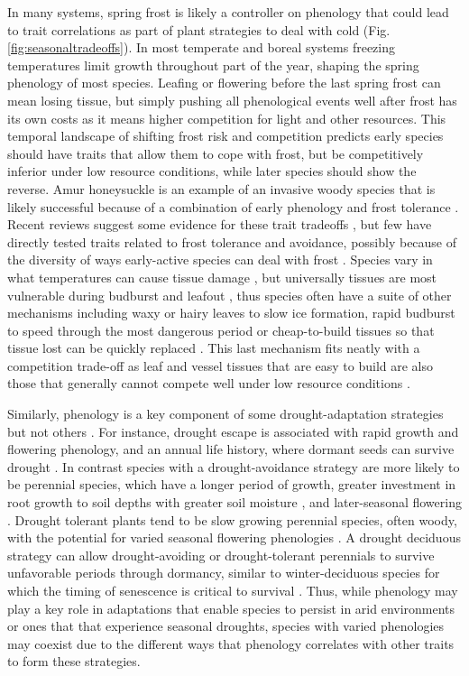 \documentclass[11pt]{article}
\begin{document}
In many systems, spring frost is likely a controller on phenology that could lead to trait correlations as part of plant strategies to deal with cold (Fig. \ref{fig:seasonaltradeoffs}). In most temperate and boreal systems freezing temperatures limit growth throughout part of the year, shaping the spring phenology of most species. Leafing or flowering before the last spring frost can mean losing tissue, but simply pushing all phenological events well after frost has its own costs as it means higher competition for light and other resources.  This temporal landscape of shifting frost risk and competition predicts early species should have traits that allow them to cope with frost, but be competitively inferior under low resource conditions, while later species should show the reverse. Amur honeysuckle is an example of an invasive woody species that is likely successful because of a combination of early phenology and frost tolerance \citep{mcewan2009leaf}. Recent reviews suggest some evidence for these trait tradeoffs \citep{wolkovich2014aob,wolkovich2021phenological}, but few have directly tested traits related to frost tolerance and avoidance, possibly because of the diversity of ways early-active species can deal with frost \citep{frostbook}. Species vary in what temperatures can cause tissue damage \citep{Lenz2013}, but universally tissues are most vulnerable during budburst and leafout \citep{frostbook,vitasse2014earlier,cat2019}, thus species often have a suite of other mechanisms including waxy or hairy leaves to slow ice formation, rapid budburst to speed through the most dangerous period or cheap-to-build tissues so that tissue lost can be quickly replaced \citep{frostbook}. This last mechanism fits neatly with a competition trade-off as leaf and vessel tissues that are easy to build are also those that generally cannot compete well under low resource conditions \citep{larcher1980,diaz2016global}. 

Similarly, phenology is a key component of some drought-adaptation strategies but not others \citep{kooyers2015evolution}. For instance, drought escape is associated with rapid growth and flowering phenology, and an annual life history, where dormant seeds can survive drought \citep{fox1992evolution}. In contrast species with a drought-avoidance strategy are more likely to be perennial species, which have a longer period of growth, greater investment in root growth to soil depths with greater soil moisture \citep{padilla2007rooting}, and later-seasonal flowering \citep{seabloom2003invasion}. Drought tolerant plants tend to be slow growing perennial species, often woody, with the potential for varied seasonal flowering phenologies \citep{williams1997leaf}.  A drought deciduous strategy can allow drought-avoiding or drought-tolerant perennials to survive unfavorable periods through dormancy, similar to winter-deciduous species for which the timing of senescence is critical to survival \citep{gillespie2017winter}. Thus, while phenology may play a key role in adaptations that enable species to persist in arid environments or ones that that experience seasonal droughts, species with varied phenologies may coexist due to the different ways that phenology correlates with other traits to form these strategies.
\end{document}
